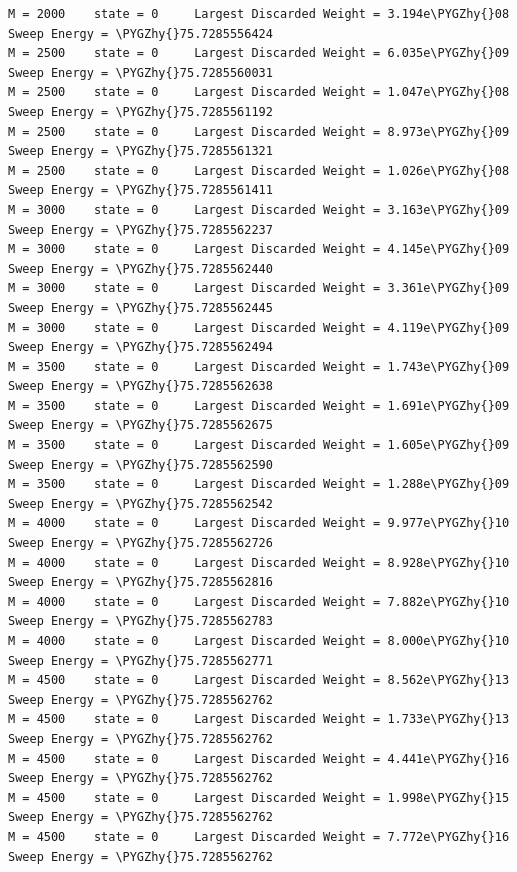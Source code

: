 \documentclass[letterpaper,10pt,english]{sphinxmanual}
\def\PYGZhy{\char`\-}
\begin{document}
\begin{Verbatim}[commandchars=\\\{\}]
M = 2000    state = 0     Largest Discarded Weight = 3.194e\PYGZhy{}08  Sweep Energy = \PYGZhy{}75.7285556424
M = 2500    state = 0     Largest Discarded Weight = 6.035e\PYGZhy{}09  Sweep Energy = \PYGZhy{}75.7285560031
M = 2500    state = 0     Largest Discarded Weight = 1.047e\PYGZhy{}08  Sweep Energy = \PYGZhy{}75.7285561192
M = 2500    state = 0     Largest Discarded Weight = 8.973e\PYGZhy{}09  Sweep Energy = \PYGZhy{}75.7285561321
M = 2500    state = 0     Largest Discarded Weight = 1.026e\PYGZhy{}08  Sweep Energy = \PYGZhy{}75.7285561411
M = 3000    state = 0     Largest Discarded Weight = 3.163e\PYGZhy{}09  Sweep Energy = \PYGZhy{}75.7285562237
M = 3000    state = 0     Largest Discarded Weight = 4.145e\PYGZhy{}09  Sweep Energy = \PYGZhy{}75.7285562440
M = 3000    state = 0     Largest Discarded Weight = 3.361e\PYGZhy{}09  Sweep Energy = \PYGZhy{}75.7285562445
M = 3000    state = 0     Largest Discarded Weight = 4.119e\PYGZhy{}09  Sweep Energy = \PYGZhy{}75.7285562494
M = 3500    state = 0     Largest Discarded Weight = 1.743e\PYGZhy{}09  Sweep Energy = \PYGZhy{}75.7285562638
M = 3500    state = 0     Largest Discarded Weight = 1.691e\PYGZhy{}09  Sweep Energy = \PYGZhy{}75.7285562675
M = 3500    state = 0     Largest Discarded Weight = 1.605e\PYGZhy{}09  Sweep Energy = \PYGZhy{}75.7285562590
M = 3500    state = 0     Largest Discarded Weight = 1.288e\PYGZhy{}09  Sweep Energy = \PYGZhy{}75.7285562542
M = 4000    state = 0     Largest Discarded Weight = 9.977e\PYGZhy{}10  Sweep Energy = \PYGZhy{}75.7285562726
M = 4000    state = 0     Largest Discarded Weight = 8.928e\PYGZhy{}10  Sweep Energy = \PYGZhy{}75.7285562816
M = 4000    state = 0     Largest Discarded Weight = 7.882e\PYGZhy{}10  Sweep Energy = \PYGZhy{}75.7285562783
M = 4000    state = 0     Largest Discarded Weight = 8.000e\PYGZhy{}10  Sweep Energy = \PYGZhy{}75.7285562771
M = 4500    state = 0     Largest Discarded Weight = 8.562e\PYGZhy{}13  Sweep Energy = \PYGZhy{}75.7285562762
M = 4500    state = 0     Largest Discarded Weight = 1.733e\PYGZhy{}13  Sweep Energy = \PYGZhy{}75.7285562762
M = 4500    state = 0     Largest Discarded Weight = 4.441e\PYGZhy{}16  Sweep Energy = \PYGZhy{}75.7285562762
M = 4500    state = 0     Largest Discarded Weight = 1.998e\PYGZhy{}15  Sweep Energy = \PYGZhy{}75.7285562762
M = 4500    state = 0     Largest Discarded Weight = 7.772e\PYGZhy{}16  Sweep Energy = \PYGZhy{}75.7285562762
\end{Verbatim}
\end{document}
